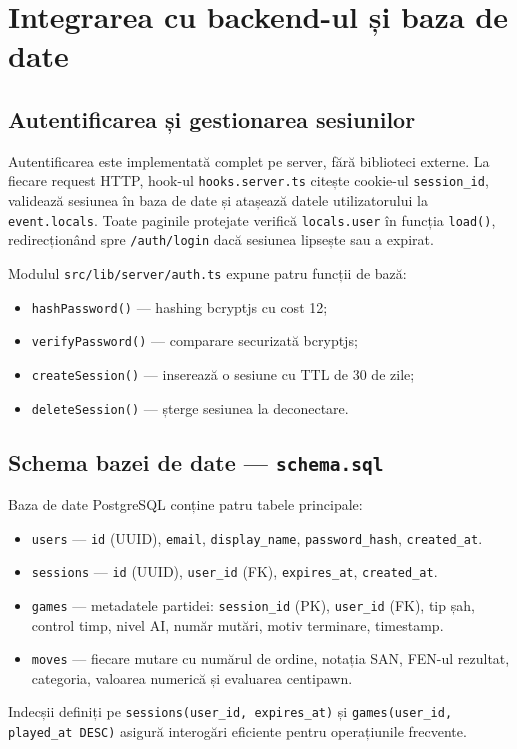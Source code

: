 \documentclass[12pt,a4paper]{article}
\begin{document}
\newpage
\section{Integrarea cu backend-ul și baza de date}

\subsection{Autentificarea și gestionarea sesiunilor}

Autentificarea este implementată complet pe server, fără biblioteci externe. La fiecare request HTTP, hook-ul \texttt{hooks.server.ts} citește cookie-ul \texttt{session\_id}, validează sesiunea în baza de date și atașează datele utilizatorului la \texttt{event.locals}. Toate paginile protejate verifică \texttt{locals.user} în funcția \texttt{load()}, redirecționând spre \texttt{/auth/login} dacă sesiunea lipsește sau a expirat.

Modulul \texttt{src/lib/server/auth.ts} expune patru funcții de bază:
\begin{itemize}
  \item \texttt{hashPassword()} — hashing bcryptjs cu cost 12;
  \item \texttt{verifyPassword()} — comparare securizată bcryptjs;
  \item \texttt{createSession()} — inserează o sesiune cu TTL de 30 de zile;
  \item \texttt{deleteSession()} — șterge sesiunea la deconectare.
\end{itemize}

\subsection{Schema bazei de date — \texttt{schema.sql}}

Baza de date PostgreSQL conține patru tabele principale:
\begin{itemize}
  \item \texttt{users} — \texttt{id} (UUID), \texttt{email}, \texttt{display\_name}, \texttt{password\_hash}, \texttt{created\_at}.
  \item \texttt{sessions} — \texttt{id} (UUID), \texttt{user\_id} (FK), \texttt{expires\_at}, \texttt{created\_at}.
  \item \texttt{games} — metadatele partidei: \texttt{session\_id} (PK), \texttt{user\_id} (FK), tip șah, control timp, nivel AI, număr mutări, motiv terminare, timestamp.
  \item \texttt{moves} — fiecare mutare cu numărul de ordine, notația SAN, FEN-ul rezultat, categoria, valoarea numerică și evaluarea centipawn.
\end{itemize}
Indecșii definiți pe \texttt{sessions(user\_id, expires\_at)} și \texttt{games(user\_id, played\_at DESC)} asigură interogări eficiente pentru operațiunile frecvente.
\end{document}
